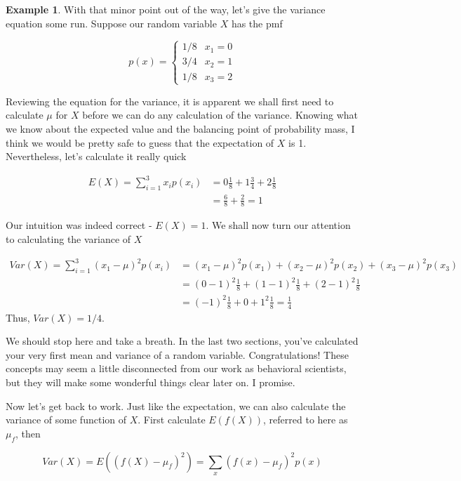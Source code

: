 \documentclass[
]{book}
\theoremstyle{definition}
\theoremstyle{definition}
\newtheorem{example}{Example}[chapter]
\theoremstyle{definition}
\theoremstyle{definition}
\theoremstyle{remark}
\begin{document}
\begin{example}
\protect\hypertarget{exm:firstvariance}{}\label{exm:firstvariance}With that minor point out of the way, let's give the variance equation some run. Suppose our random variable \(X\) has the pmf

\[
p(x) = 
\begin{cases}
1/8 & x_1 = 0 \\
3/4 & x_2 = 1 \\
1/8 & x_3 = 2
\end{cases}
\]

Reviewing the equation for the variance, it is apparent we shall first need to calculate \(\mu\) for \(X\) before we can do any calculation of the variance. Knowing what we know about the expected value and the balancing point of probability mass, I think we would be pretty safe to guess that the expectation of \(X\) is 1. Nevertheless, let's calculate it really quick

\begin{align}
E(X) = \sum_{i=1}^{3} x_ip(x_i) &= 0\frac{1}{8}+ 1\frac{3}{4} + 2\frac{1}{8} \\
&= \frac{6}{8} + \frac{2}{8} = 1
\end{align}

Our intuition was indeed correct - \(E(X) = 1\). We shall now turn our attention to calculating the variance of \(X\)

\begin{align}
Var(X) = \sum_{i=1}^{3} (x_1-\mu)^2p(x_i) &= (x_1-\mu)^2p(x_1) + (x_2-\mu)^2p(x_2) + (x_3-\mu)^2p(x_3) \\
&= (0 - 1)^2\frac{1}{8} + (1-1)^2\frac{1}{8} + (2-1)^2\frac{1}{8} \\
&= (-1)^2\frac{1}{8} + 0 + 1^2\frac{1}{8} = \frac{1}{4}
\end{align}
Thus, \(Var(X) = 1/4\).

We should stop here and take a breath. In the last two sections, you've calculated your very first mean and variance of a random variable. Congratulations! These concepts may seem a little disconnected from our work as behavioral scientists, but they will make some wonderful things clear later on. I promise.
\end{example}

Now let's get back to work. Just like the expectation, we can also calculate the variance of some function of \(X\). First calculate \(E(f(X))\), referred to here as \(\mu_f\), then

\[
Var(X) = E((f(X)-\mu_f)^2) = \sum_{x}^{} (f(x) - \mu_f)^2p(x)
\label{eq:discretevariancef}
\]
\end{document}
